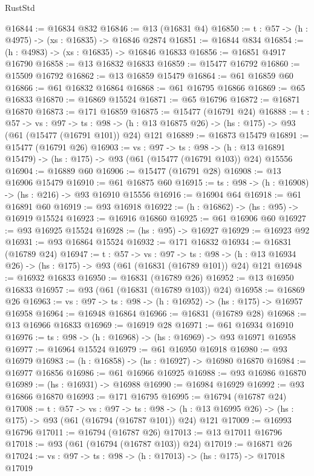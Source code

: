 \begin{lexlean}{RustStd}
\begin{coremodule}
@16844 := @16834 @832
@16846 := @13 (@16831 @4)
@16850 := {t : @57} -> (h : @4975) -> (xs : @16835) -> @16846 @2874
@16851 := @16844 @834
@16854 := (h : @4983) -> (xs : @16835) -> @16846 @16833
@16856 := @16851 @4917 @16790
@16858 := @13 @16832 @16833
@16859 := @15477 @16792
@16860 := @15509 @16792
@16862 := @13 @16859 @15479
@16864 := @61 @16859 @60
@16866 := @61 @16832 @16864
@16868 := @61 @16795 @16866
@16869 := @65 @16833
@16870 := @16869 @15524
@16871 := @65 @16796
@16872 := @16871 @16870
@16873 := @171 @16859
@16875 := @15477 (@16791 @24)
@16888 := {t : @57} ->
  {vs : @97} ->
  {ts : @98} -> (h : @13 @16875 @26) -> (hs : @175) -> @93 (@61 (@15477 (@16791 @101)) @24) @121
@16889 := @16873 @15479
@16891 := @15477 (@16791 @26)
@16903 := {vs : @97} ->
  {ts : @98} ->
  (h : @13 @16891 @15479) -> (hs : @175) -> @93 (@61 (@15477 (@16791 @103)) @24) @15556
@16904 := @16889 @60
@16906 := @15477 (@16791 @28)
@16908 := @13 @16906 @15479
@16910 := @61 @16875 @60
@16915 := {ts : @98} -> (h : @16908) -> (hs : @216) -> @93 @16910 @15556
@16916 := @16904 @64
@16918 := @61 @16891 @60
@16919 := @93 @16918
@16922 := (h : @16862) -> (hs : @95) -> @16919 @15524
@16923 := @16916 @16860
@16925 := @61 @16906 @60
@16927 := @93 @16925 @15524
@16928 := (hs : @95) -> @16927
@16929 := @16923 @92
@16931 := @93 @16864 @15524
@16932 := @171 @16832
@16934 := @16831 (@16789 @24)
@16947 := {t : @57} ->
  {vs : @97} ->
  {ts : @98} -> (h : @13 @16934 @26) -> (hs : @175) -> @93 (@61 (@16831 (@16789 @101)) @24) @121
@16948 := @16932 @16833
@16950 := @16831 (@16789 @26)
@16952 := @13 @16950 @16833
@16957 := @93 (@61 (@16831 (@16789 @103)) @24)
@16958 := @16869 @26
@16963 := {vs : @97} -> {ts : @98} -> (h : @16952) -> (hs : @175) -> @16957 @16958
@16964 := @16948 @16864
@16966 := @16831 (@16789 @28)
@16968 := @13 @16966 @16833
@16969 := @16919 @28
@16971 := @61 @16934 @16910
@16976 := {ts : @98} -> (h : @16968) -> (hs : @16969) -> @93 @16971 @16958
@16977 := @16964 @15524
@16979 := @61 @16950 @16918
@16980 := @93 @16979
@16983 := (h : @16858) -> (hs : @16927) -> @16980 @16870
@16984 := @16977 @16856
@16986 := @61 @16966 @16925
@16988 := @93 @16986 @16870
@16989 := (hs : @16931) -> @16988
@16990 := @16984 @16929
@16992 := @93 @16866 @16870
@16993 := @171 @16795
@16995 := @16794 (@16787 @24)
@17008 := {t : @57} ->
  {vs : @97} ->
  {ts : @98} -> (h : @13 @16995 @26) -> (hs : @175) -> @93 (@61 (@16794 (@16787 @101)) @24) @121
@17009 := @16993 @16796
@17011 := @16794 (@16787 @26)
@17013 := @13 @17011 @16796
@17018 := @93 (@61 (@16794 (@16787 @103)) @24)
@17019 := @16871 @26
@17024 := {vs : @97} -> {ts : @98} -> (h : @17013) -> (hs : @175) -> @17018 @17019

\end{coremodule}
\end{lexlean}
